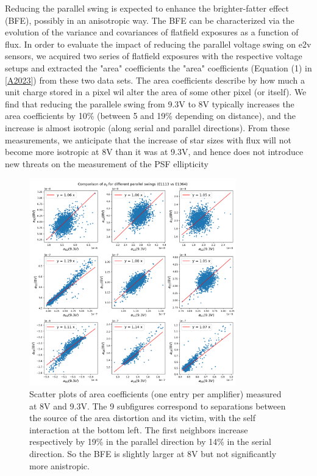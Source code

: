 Reducing the parallel swing is expected to enhance the brighter-fatter
effect (BFE), possibly in an anisotropic way. The BFE can be
characterized via the evolution of the variance and covariances of
flatfield exposures as a function of flux. In order to evaluate the
impact of reducing the parallel voltage swing on e2v sensors, we
acquired two series of flatfield exposures with the respective voltage
setups and extracted the "area" coefficients the "area" coefficients
(Equation (1) in \hyperref[A2023]{{[}A2023{]}}) from these two data
sets. The area coefficients describe by how much a unit charge stored in
a pixel wil alter the area of some other pixel (or itself). We find that
reducing the parallele swing from 9.3V to 8V typically increases the
area coefficients by 10\% (between 5 and 19\% depending on distance),
and the increase is almost isotropic (along serial and parallel
directions). From these measurements, we anticipate that the increase of
star sizes with flux will not become more isotropic at 8V than it was at
9.3V, and hence does not introduce new threats on the measurement of the
PSF ellipticity

\begin{figure}
\begin{centering}
\includegraphics[width=0.8\textwidth]{sections/figures/aScatterPlots8vs9-3.png}
\end{centering}
\caption{Scatter plots of area coefficients (one entry per amplifier)
measured at 8V and 9.3V. The 9 subfigures correspond to separations
between the source of the area distortion and its victim, with the self
interaction at the bottom left. The first neighbors increase
respectively by 19\% in the parallel direction by 14\% in the serial
direction. So the BFE is slightly larger at 8V but not significantly
more anistropic.}
\end{figure}


